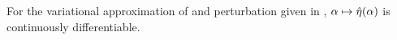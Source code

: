 
\begin{cor}
%
For the variational approximation of  and perturbation
given in , $\alpha \mapsto \hat\eta(\alpha)$
is continuously differentiable.
%
\end{cor}

